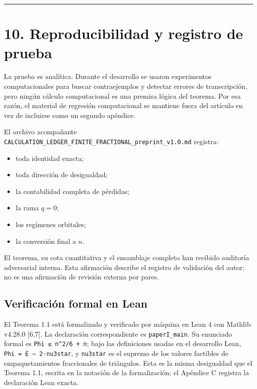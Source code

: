 \documentclass[
  11pt,
]{article}
\providecommand{\tightlist}{%
  \setlength{\itemsep}{0pt}\setlength{\parskip}{0pt}}
\begin{document}
\begin{center}\rule{0.5\linewidth}{0.5pt}\end{center}

\section{10. Reproducibilidad y registro de
prueba}\label{reproducibilidad-y-registro-de-prueba}

La prueba es analítica. Durante el desarrollo se usaron experimentos
computacionales para buscar contraejemplos y detectar errores de
transcripción, pero ningún cálculo computacional es una premisa lógica
del teorema. Por esa razón, el material de regresión computacional se
mantiene fuera del artículo en vez de incluirse como un segundo
apéndice.

El archivo acompañante
\texttt{CALCULATION\_LEDGER\_FINITE\_FRACTIONAL\_preprint\_v1.0.md}
registra:

\begin{itemize}
\tightlist
\item
  toda identidad exacta;
\item
  toda dirección de desigualdad;
\item
  la contabilidad completa de pérdidas;
\item
  la rama \(q=0\);
\item
  los regímenes orbitales;
\item
  la conversión final a \(n\).
\end{itemize}

El teorema, su cota cuantitativa y el ensamblaje completo han recibido
auditoría adversarial interna. Esta afirmación describe el registro de
validación del autor; no es una afirmación de revisión externa por
pares.

\subsection{Verificación formal en
Lean}\label{verificaciuxf3n-formal-en-lean}

El Teorema 1.1 está formalizado y verificado por máquina en Lean 4 con
Mathlib v4.28.0 {[}6,7{]}. La declaración correspondiente es
\texttt{paperI\_main}. Su enunciado formal es
\texttt{Phi\ ≤\ n\^{}2/6\ +\ n}; bajo las definiciones usadas en el
desarrollo Lean, \texttt{Phi\ =\ \textbar{}E\textbar{}\ −\ 2·nu3star}, y
\texttt{nu3star} es el supremo de los valores factibles de
empaquetamientos fraccionales de triángulos. Esta es la misma
desigualdad que el Teorema 1.1, escrita en la notación de la
formalización; el Apéndice C registra la declaración Lean exacta.
\end{document}
